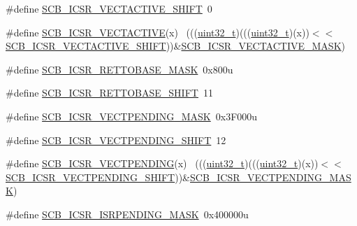 \begin{DoxyCompactItemize}
\#define \hyperlink{group___s_c_b___register___masks_ga02696369c8528292cf4f41897d83b156}{S\+C\+B\+\_\+\+I\+C\+S\+R\+\_\+\+V\+E\+C\+T\+A\+C\+T\+I\+V\+E\+\_\+\+S\+H\+I\+FT}~0
\item 
\#define \hyperlink{group___s_c_b___register___masks_gacb9e76e7fa9000878ba2be80556f2013}{S\+C\+B\+\_\+\+I\+C\+S\+R\+\_\+\+V\+E\+C\+T\+A\+C\+T\+I\+VE}(x)                                  ~(((\hyperlink{_p_e___types_8h_a33594304e786b158f3fb30289278f5af}{uint32\+\_\+t})(((\hyperlink{_p_e___types_8h_a33594304e786b158f3fb30289278f5af}{uint32\+\_\+t})(x))$<$$<$\hyperlink{group___s_c_b___register___masks_ga02696369c8528292cf4f41897d83b156}{S\+C\+B\+\_\+\+I\+C\+S\+R\+\_\+\+V\+E\+C\+T\+A\+C\+T\+I\+V\+E\+\_\+\+S\+H\+I\+FT}))\&\hyperlink{group___s_c_b___register___masks_ga5818ac6e0642a5053dd525d82623054b}{S\+C\+B\+\_\+\+I\+C\+S\+R\+\_\+\+V\+E\+C\+T\+A\+C\+T\+I\+V\+E\+\_\+\+M\+A\+SK})
\item 
\#define \hyperlink{group___s_c_b___register___masks_gacda381108ff1ef433d9eb72675daa756}{S\+C\+B\+\_\+\+I\+C\+S\+R\+\_\+\+R\+E\+T\+T\+O\+B\+A\+S\+E\+\_\+\+M\+A\+SK}~0x800u
\item 
\#define \hyperlink{group___s_c_b___register___masks_ga45dfe30e87627611e59ecb380dea9b54}{S\+C\+B\+\_\+\+I\+C\+S\+R\+\_\+\+R\+E\+T\+T\+O\+B\+A\+S\+E\+\_\+\+S\+H\+I\+FT}~11
\item 
\#define \hyperlink{group___s_c_b___register___masks_ga75b38d5feedc920a7d0a51484330b7d7}{S\+C\+B\+\_\+\+I\+C\+S\+R\+\_\+\+V\+E\+C\+T\+P\+E\+N\+D\+I\+N\+G\+\_\+\+M\+A\+SK}~0x3\+F000u
\item 
\#define \hyperlink{group___s_c_b___register___masks_ga345baf83f90de34c6c67edb24968fcc7}{S\+C\+B\+\_\+\+I\+C\+S\+R\+\_\+\+V\+E\+C\+T\+P\+E\+N\+D\+I\+N\+G\+\_\+\+S\+H\+I\+FT}~12
\item 
\#define \hyperlink{group___s_c_b___register___masks_ga17bdf1522c873773ad5e72052f2591c6}{S\+C\+B\+\_\+\+I\+C\+S\+R\+\_\+\+V\+E\+C\+T\+P\+E\+N\+D\+I\+NG}(x)                                ~(((\hyperlink{_p_e___types_8h_a33594304e786b158f3fb30289278f5af}{uint32\+\_\+t})(((\hyperlink{_p_e___types_8h_a33594304e786b158f3fb30289278f5af}{uint32\+\_\+t})(x))$<$$<$\hyperlink{group___s_c_b___register___masks_ga345baf83f90de34c6c67edb24968fcc7}{S\+C\+B\+\_\+\+I\+C\+S\+R\+\_\+\+V\+E\+C\+T\+P\+E\+N\+D\+I\+N\+G\+\_\+\+S\+H\+I\+FT}))\&\hyperlink{group___s_c_b___register___masks_ga75b38d5feedc920a7d0a51484330b7d7}{S\+C\+B\+\_\+\+I\+C\+S\+R\+\_\+\+V\+E\+C\+T\+P\+E\+N\+D\+I\+N\+G\+\_\+\+M\+A\+SK})
\item 
\#define \hyperlink{group___s_c_b___register___masks_gaccd41792c40fc7ab2b03678da539ad65}{S\+C\+B\+\_\+\+I\+C\+S\+R\+\_\+\+I\+S\+R\+P\+E\+N\+D\+I\+N\+G\+\_\+\+M\+A\+SK}~0x400000u

\end{DoxyCompactItemize}
